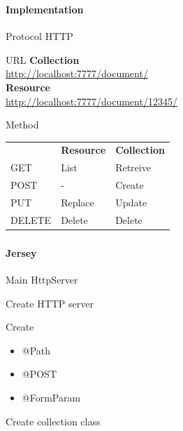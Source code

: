 \documentclass[handout]{beamer}
\begin{document}
\begin{frame}
	\frametitle{\insertsection}
	\framesubtitle{Implementation}
	\begin{block}{Protocol}
		HTTP
	\end{block}
	\begin{block}{URL}
		\textbf{Collection} \\
		\url{http://localhost:7777/document/} \\
		\textbf{Resource} \\
		\url{http://localhost:7777/document/12345/}
	\end{block}
	\begin{block}{Method}
		\begin{tabular}{lll}
			& \textbf{Resource} & \textbf{Collection} \\
			GET & List & Retreive \\
			POST & - & Create \\
			PUT & Replace & Update \\
			DELETE & Delete & Delete \\
		\end{tabular}
	\end{block}
\end{frame}

\begin{frame}
	\frametitle{\insertsection}
	\framesubtitle{Jersey}
	\begin{block}{Main}
		HttpServer
	\end{block}
	\begin{semiverbatim}
		Create HTTP server
	\end{semiverbatim}
	\begin{block}{Create}
		\begin{itemize}
			\item @Path
			\item @POST
			\item @FormParam
		\end{itemize}
	\end{block}
	\begin{semiverbatim}
		Create collection class
	\end{semiverbatim}
\end{frame}
\end{document}
